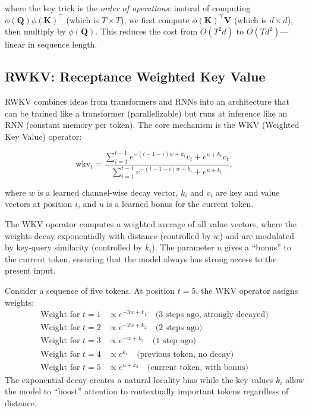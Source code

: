 where the key trick is the \emph{order of operations}: instead of computing $\phi(\mathbf{Q})\phi(\mathbf{K})^\top$ (which is $T \times T$), we first compute $\phi(\mathbf{K})^\top \mathbf{V}$ (which is $d \times d$), then multiply by $\phi(\mathbf{Q})$. This reduces the cost from $O(T^2 d)$ to $O(T d^2)$---linear in sequence length.

\subsection{RWKV: Receptance Weighted Key Value}

RWKV \citep{peng2023} combines ideas from transformers and RNNs into an architecture that can be trained like a transformer (parallelizable) but runs at inference like an RNN (constant memory per token). The core mechanism is the WKV (Weighted Key Value) operator:

\begin{equation}
\text{wkv}_t = \frac{\sum_{i=1}^{t-1} e^{-(t-1-i)w + k_i} v_i + e^{u + k_t} v_t}{\sum_{i=1}^{t-1} e^{-(t-1-i)w + k_i} + e^{u + k_t}},
\label{eq:wkv}
\end{equation}

where $w$ is a learned channel-wise decay vector, $k_i$ and $v_i$ are key and value vectors at position $i$, and $u$ is a learned bonus for the current token.

\begin{definition}
The WKV operator computes a weighted average of all value vectors, where the weights decay exponentially with distance (controlled by $w$) and are modulated by key-query similarity (controlled by $k_i$). The parameter $u$ gives a ``bonus'' to the current token, ensuring that the model always has strong access to the present input.
\end{definition}

\begin{example}
Consider a sequence of five tokens. At position $t=5$, the WKV operator assigns weights:
\begin{align*}
\text{Weight for } t=1 &\propto e^{-3w + k_1} \quad \text{(3 steps ago, strongly decayed)} \\
\text{Weight for } t=2 &\propto e^{-2w + k_2} \quad \text{(2 steps ago)} \\
\text{Weight for } t=3 &\propto e^{-w + k_3} \quad \text{(1 step ago)} \\
\text{Weight for } t=4 &\propto e^{k_4} \quad \text{(previous token, no decay)} \\
\text{Weight for } t=5 &\propto e^{u + k_5} \quad \text{(current token, with bonus)}
\end{align*}
The exponential decay creates a natural locality bias while the key values $k_i$ allow the model to ``boost'' attention to contextually important tokens regardless of distance.
\end{example}


